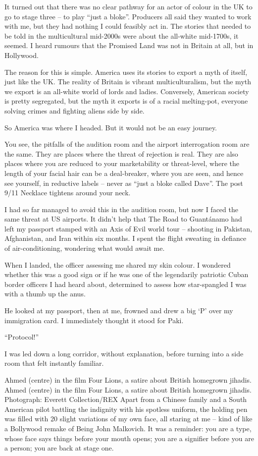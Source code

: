 \documentclass[10pt,a4paper]{article}
\begin{document}
It turned out that there was no clear pathway for an actor of colour in the UK to go to stage three – to play “just a bloke”. Producers all said they wanted to work with me, but they had nothing I could feasibly act in. The stories that needed to be told in the multicultural mid-2000s were about the all-white mid-1700s, it seemed. I heard rumours that the Promised Land was not in Britain at all, but in Hollywood.

The reason for this is simple. America uses its stories to export a myth of itself, just like the UK. The reality of Britain is vibrant multiculturalism, but the myth we export is an all-white world of lords and ladies. Conversely, American society is pretty segregated, but the myth it exports is of a racial melting-pot, everyone solving crimes and fighting aliens side by side.

So America was where I headed. But it would not be an easy journey.

You see, the pitfalls of the audition room and the airport interrogation room are the same. They are places where the threat of rejection is real. They are also places where you are reduced to your marketability or threat-level, where the length of your facial hair can be a deal-breaker, where you are seen, and hence see yourself, in reductive labels – never as “just a bloke called Dave”. The post 9/11 Necklace tightens around your neck.

I had so far managed to avoid this in the audition room, but now I faced the same threat at US airports. It didn’t help that The Road to Guantánamo had left my passport stamped with an Axis of Evil world tour – shooting in Pakistan, Afghanistan, and Iran within six months. I spent the flight sweating in defiance of air-conditioning, wondering what would await me.

When I landed, the officer assessing me shared my skin colour. I wondered whether this was a good sign or if he was one of the legendarily patriotic Cuban border officers I had heard about, determined to assess how star-spangled I was with a thumb up the anus.

He looked at my passport, then at me, frowned and drew a big ‘P’ over my immigration card. I immediately thought it stood for Paki.

“Protocol!”

I was led down a long corridor, without explanation, before turning into a side room that felt instantly familiar.

Ahmed (centre) in the film Four Lions, a satire about British homegrown jihadis.
Ahmed (centre) in the film Four Lions, a satire about British homegrown jihadis. Photograph: Everett Collection/REX
Apart from a Chinese family and a South American pilot battling the indignity with his spotless uniform, the holding pen was filled with 20 slight variations of my own face, all staring at me – kind of like a Bollywood remake of Being John Malkovich. It was a reminder: you are a type, whose face says things before your mouth opens; you are a signifier before you are a person; you are back at stage one.
\end{document}
